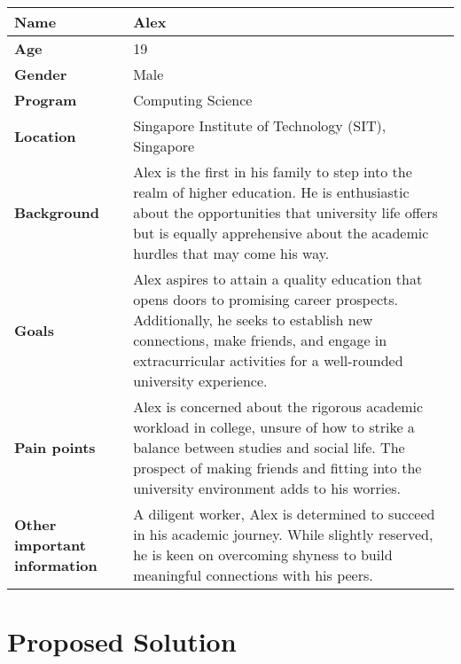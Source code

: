 \begin{center}
\begin{longtable}{|l|p{10cm}|}
\hline
\textbf{Name} & Alex \\
\hline
\textbf{Age} & 19 \\
\hline
\textbf{Gender} & Male \\
\hline
\textbf{Program} & Computing Science \\
\hline
\textbf{Location} & Singapore Institute of Technology (SIT), Singapore\\
\hline
\textbf{Background} & Alex is the first in his family to step into the realm of higher education. He is enthusiastic about the opportunities that university life offers but is equally apprehensive about the academic hurdles that may come his way. \\
\hline
\textbf{Goals} & Alex aspires to attain a quality education that opens doors to promising career prospects. Additionally, he seeks to establish new connections, make friends, and engage in extracurricular activities for a well-rounded university experience. \\
\hline
\textbf{Pain points} & Alex is concerned about the rigorous academic workload in college, unsure of how to strike a balance between studies and social life. The prospect of making friends and fitting into the university environment adds to his worries. \\
\hline
\textbf{Other important information} & A diligent worker, Alex is determined to succeed in his academic journey. While slightly reserved, he is keen on overcoming shyness to build meaningful connections with his peers. \\
\hline
\end{longtable}
\end{center}


\section{Proposed Solution}\label{proposed_solution}

% 
